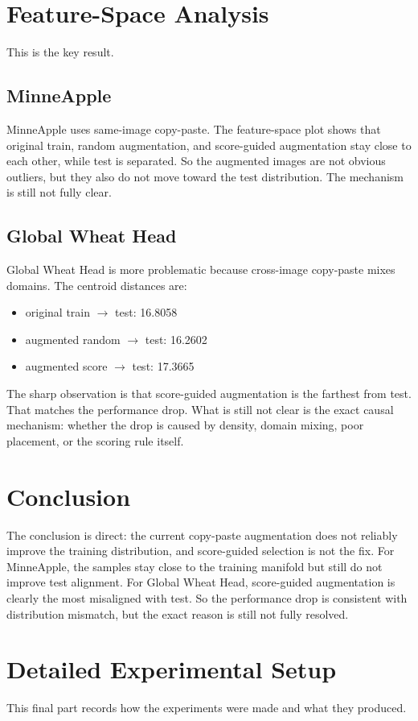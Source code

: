 \documentclass[11pt, a4paper]{article}
\begin{document}
\section{Feature-Space Analysis}
This is the key result.

\subsection{MinneApple}
MinneApple uses same-image copy-paste. The feature-space plot shows that original train, random augmentation, and score-guided augmentation stay close to each other, while test is separated. So the augmented images are not obvious outliers, but they also do not move toward the test distribution. The mechanism is still not fully clear.

\subsection{Global Wheat Head}
Global Wheat Head is more problematic because cross-image copy-paste mixes domains. The centroid distances are:
\begin{itemize}
    \item original train $\rightarrow$ test: 16.8058
    \item augmented random $\rightarrow$ test: 16.2602
    \item augmented score $\rightarrow$ test: 17.3665
\end{itemize}

The sharp observation is that score-guided augmentation is the farthest from test. That matches the performance drop. What is still not clear is the exact causal mechanism: whether the drop is caused by density, domain mixing, poor placement, or the scoring rule itself.

\section{Conclusion}
The conclusion is direct: the current copy-paste augmentation does not reliably improve the training distribution, and score-guided selection is not the fix. For MinneApple, the samples stay close to the training manifold but still do not improve test alignment. For Global Wheat Head, score-guided augmentation is clearly the most misaligned with test. So the performance drop is consistent with distribution mismatch, but the exact reason is still not fully resolved.

\section{Detailed Experimental Setup}
This final part records how the experiments were made and what they produced.
\end{document}
